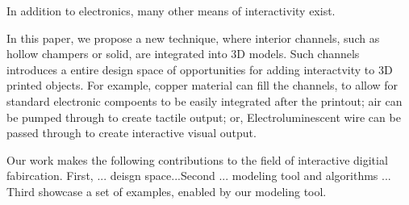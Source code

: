In addition to electronics, many other means of interactivity exist.


In this paper, we propose a new technique, where interior channels, such as hollow champers or solid, are integrated into 3D models. Such channels introduces a entire design space of opportunities for adding interactvity to 3D printed objects. For example, copper material can fill the channels, to allow for standard electronic compoents to be easily integrated after the printout; air can be pumped through to create tactile output; or, Electroluminescent wire can be passed through to create interactive visual output.

Our work makes the following contributions to the field of interactive digitial fabircation. First, ... deisgn space...Second ... modeling tool and algorithms ... Third showcase a set of examples, enabled by our modeling tool.
